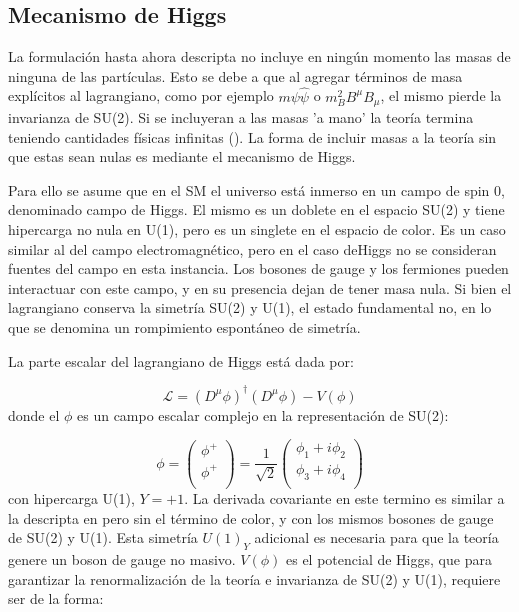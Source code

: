 \subsection{Mecanismo de Higgs}

La formulación hasta ahora descripta no incluye en ningún momento las masas de ninguna de las partículas. Esto se debe a que al agregar términos de masa explícitos al lagrangiano, como por ejemplo $m\psi\hat{\psi}$ o $m_B^2 B^{\mu}B_{\mu}$, el mismo pierde la invarianza de SU(2). Si se incluyeran a las masas 'a mano' la teoría termina teniendo cantidades físicas infinitas (). La forma de incluir masas a la teoría sin que estas sean nulas es mediante el mecanismo de Higgs. 

 Para ello se asume que en el SM el universo está inmerso en un campo de spin 0, denominado campo de Higgs. El mismo es un doblete en el espacio SU(2) y tiene hipercarga no nula en U(1), pero es un singlete en el espacio de color. Es un caso similar al del campo electromagnético, pero en el caso deHiggs no se consideran fuentes del campo en esta instancia. Los bosones de gauge y los fermiones pueden interactuar con este campo, y en su presencia dejan de tener masa nula. Si bien el lagrangiano conserva la simetría SU(2) y U(1), el estado fundamental no, en lo que se denomina un rompimiento espontáneo de simetría.

La parte escalar del lagrangiano de Higgs está dada por:

\begin{equation}
\mathcal{L} = (D^{\mu}\phi)^{\dagger}(D^{\mu}\phi) - V(\phi)
\end{equation}
%
donde el $\phi$ es un campo escalar complejo en la representación de SU(2):

\begin{equation}
	\phi = 
	\begin{pmatrix}
	\phi^{+} \\
	\phi^{+} \\
	\end{pmatrix} = \frac{1}{\sqrt{2}}
	\begin{pmatrix}
	\phi_{1} + i\phi_{2} \\
	\phi_{3} + i\phi_{4} \\
	\end{pmatrix}
\end{equation}
%
con hipercarga U(1), $Y=+1$. La derivada covariante en este termino es similar a la descripta en pero sin el término de color, y con los mismos bosones de gauge de SU(2) y U(1). Esta simetría $U(1)_Y$ adicional es necesaria para que la teoría genere un boson de gauge no masivo.
$V(\phi)$ es el potencial de Higgs, que para garantizar la renormalización de la teoría e invarianza de SU(2) y U(1), requiere ser de la forma:

